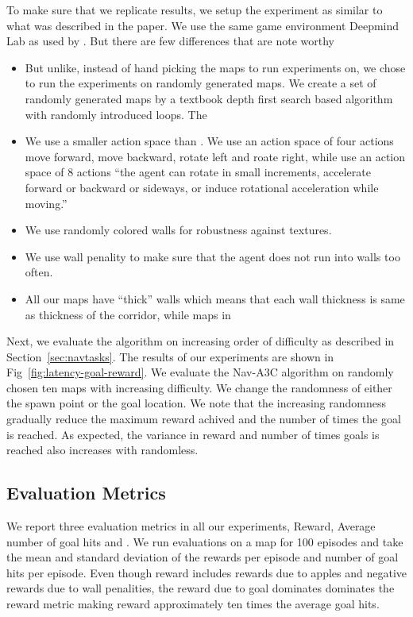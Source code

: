 To make sure that we replicate \cite{MiPaViICLR2017} results, we setup the experiment as similar to what was described in the paper. We use the same game environment Deepmind Lab \cite{BeLeTeARXIV2016} as used by \cite{MiPaViICLR2017}. But there are few differences that are note worthy
\begin{itemize}
\item But unlike, \cite{MiPaViICLR2017} instead of hand picking the maps to run experiments on, we chose to run the experiments on randomly generated maps.
We create a set of randomly generated maps by a textbook depth first search based algorithm with randomly introduced loops. The 
\item We use a smaller action space than \cite{MiPaViICLR2017}. We use an action space of four actions move forward, move backward, rotate left and roate right, while \cite{MiPaViICLR2017} use an action space of 8 actions ``the agent can rotate in small increments, accelerate forward or backward or
sideways, or induce rotational acceleration while moving.''
\item We use randomly colored walls for robustness against textures.
\item We use wall penality to make sure that the agent does not run into walls too often.
\item All our maps have ``thick'' walls which means that each wall thickness is same as thickness of the corridor, while maps in \cite{MiPaViICLR2017}
\end{itemize}

Next, we evaluate the algorithm on increasing order of difficulty as described in Section~\ref{sec:navtasks}. The results of our experiments are shown in Fig~\ref{fig:latency-goal-reward}.
We evaluate the Nav-A3C\cite{MiPaViICLR2017} algorithm on randomly chosen ten maps with increasing difficulty.
We change the randomness of either the spawn point or the goal location.
We note that the increasing randomness gradually reduce the maximum reward achived and the number of times the goal is reached. As expected, the variance in reward and number of times goals is reached also increases with randomless.

\subsection{Evaluation Metrics}
We report three evaluation metrics in all our experiments, Reward, Average number of goal hits and \LatencyOneGtOne. We run evaluations on a map for 100 episodes and take the mean and standard deviation of the rewards per episode and number of goal hits per episode. Even though reward includes rewards due to apples and negative rewards due to wall penalities, the reward due to goal dominates dominates the reward metric making reward approximately ten times the average goal hits.

